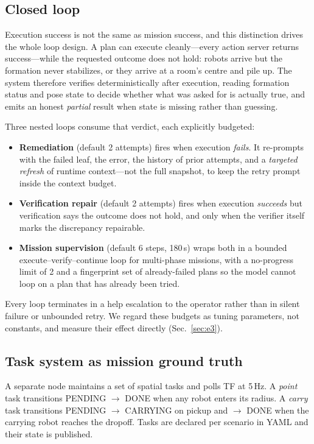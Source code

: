 \documentclass[10pt,twocolumn]{article}
\begin{document}
\subsection{Closed loop}
\label{sec:closedloop}

Execution success is not the same as mission success, and this distinction
drives the whole loop design. A plan can execute cleanly---every action server
returns success---while the requested outcome does not hold: robots arrive but
the formation never stabilizes, or they arrive at a room's centre and pile up.
The system therefore verifies deterministically after execution, reading
formation status and pose state to decide whether what was asked for is
actually true, and emits an honest \emph{partial} result when state is missing
rather than guessing.

Three nested loops consume that verdict, each explicitly budgeted:

\begin{itemize}
\item \textbf{Remediation} (default 2 attempts) fires when execution
\emph{fails}. It re-prompts with the failed leaf, the error, the history of
prior attempts, and a \emph{targeted refresh} of runtime context---not the full
snapshot, to keep the retry prompt inside the context budget.
\item \textbf{Verification repair} (default 2 attempts) fires when execution
\emph{succeeds} but verification says the outcome does not hold, and only when
the verifier itself marks the discrepancy repairable.
\item \textbf{Mission supervision} (default 6 steps, 180\,s) wraps both in a
bounded execute--verify--continue loop for multi-phase missions, with a
no-progress limit of 2 and a fingerprint set of already-failed plans so the
model cannot loop on a plan that has already been tried.
\end{itemize}

Every loop terminates in a help escalation to the operator rather than in
silent failure or unbounded retry. We regard these budgets as tuning
parameters, not constants, and measure their effect directly
(Sec.~\ref{sec:e3}).

\subsection{Task system as mission ground truth}
\label{sec:tasks}

A separate node maintains a set of spatial tasks and polls TF at 5\,Hz. A
\emph{point} task transitions PENDING $\rightarrow$ DONE when any robot enters
its radius. A \emph{carry} task transitions PENDING $\rightarrow$ CARRYING on
pickup and $\rightarrow$ DONE when the carrying robot reaches the dropoff.
Tasks are declared per scenario in YAML and their state is published.
\end{document}
